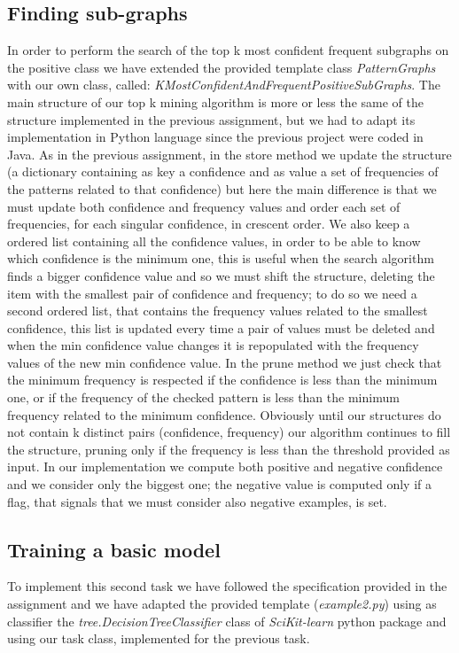 \documentclass[11pt, a4paper]{article}
\begin{document}
		\subsection{Finding sub-graphs}
			In order to perform the search of the top k most confident frequent subgraphs on the positive class we have extended the provided template class \textit{PatternGraphs} with our own class, called: \newline \textit{K\textunderscore MostConfidentAndFrequentPositiveSubGraphs}.\newline
			The main structure of our top k mining algorithm is more or less the same of the structure implemented in the previous assignment, but we had to adapt its implementation in Python language since the previous project were coded in Java.
			As in the previous assignment, in the store method we update the structure (a dictionary containing as key a confidence and as value a set of frequencies of the patterns related to that confidence) but here the main difference is that we must update both confidence and frequency values and order each set of frequencies, for each singular confidence, in crescent order. We also keep a ordered list containing all the confidence values, in order to be able to know which confidence is the minimum one, this is useful when the search algorithm finds a bigger confidence value and so we must shift the structure, deleting the item with the smallest pair of confidence and frequency; to do so we need a second ordered list, that contains the frequency values related to the smallest confidence, this list is updated every time a pair of values must be deleted and when the min confidence value changes it is repopulated with the frequency values of the new min confidence value.\newline
			In the prune method we just check that the minimum frequency is respected if the confidence is less than the minimum one, or if the frequency of the checked pattern is less than the minimum frequency related to the minimum confidence.
			Obviously until our structures do not contain k distinct pairs (confidence, frequency) our algorithm continues to fill the structure, pruning only if the frequency is less than the threshold provided as input.
			In our implementation we compute both positive and negative confidence and we consider only the biggest one; the negative value is computed only if a flag, that signals that we must consider also negative examples, is set.

		\subsection{Training a basic model}
			To implement this second task we have followed the specification provided in the assignment and we have adapted the provided template (\textit{example2.py}) using as classifier the \textit{tree.DecisionTreeClassifier} class of \textit{SciKit-learn} python package and using our task class, implemented for the previous task.
\end{document}
